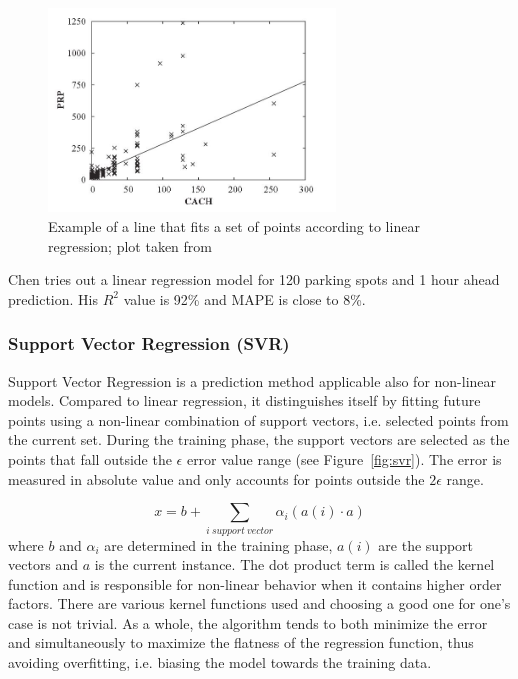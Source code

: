 \documentclass{article}
\begin{document}
\begin{figure}[!ht]
    \centering
    \includegraphics[width=3.0in]{linear-regression}
    \caption{Example of a line that fits a set of points according to linear regression; plot taken from \cite{Witten} }
    \label{fig:linear-regression}
\end{figure}


\vspace{2mm}
Chen\cite{Chen} tries out a linear regression model for 120 parking spots and 1 hour ahead prediction. His $R^2$ value is 92\% and MAPE is close to 8\%.

\subsubsection{Support Vector Regression (SVR)}
Support Vector Regression is a prediction method applicable also for non-linear models. Compared to linear regression, it distinguishes itself by fitting future points using a non-linear combination of support vectors, i.e. selected points from the current set. During the training phase, the support vectors are selected as the points that fall outside the $\epsilon$ error value range (see Figure~\ref{fig:svr}). The error is measured in absolute value and only accounts for points outside the $2\epsilon$ range. 

$$x = b + \sum_{i\:support\:vector} \alpha_i (a(i) \cdot a)  $$
where $b$ and $\alpha_i$ are determined in the training phase, $a(i)$ are the support vectors and $a$ is the current instance.  The dot product term is called the kernel function and is responsible for non-linear behavior when it contains higher order factors. There are various kernel functions used and choosing a good one for one's case is not trivial. As a whole, the algorithm tends to both minimize the error and simultaneously to maximize the flatness of the regression function, thus avoiding overfitting, i.e. biasing the model towards the training data.
\end{document}
